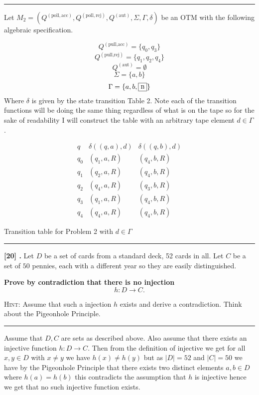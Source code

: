 \documentclass[11pt,twoside]{article}
\newcounter{problem}
\newcommand{\problem}[1]{%
\refstepcounter{problem}\noindent\textbf{[#1] \arabic{problem}.}}
\newcommand{\solution}{\bigskip\hrule\bigskip}
\newcommand{\problembreak}{\bigskip\hrule\bigskip}
\newcommand{\Qpollacc}{Q^{\left(\mathrm{poll,acc}\right)}}
\newcommand{\Qpollrej}{Q^{\left(\mathrm{poll,rej}\right)}}
\newcommand{\Qaut}{Q^{\left(\mathrm{aut}\right)}}
\newcommand{\blank}{\ensuremath\fbox{\sc b}}
\begin{document}
\solution

Let $M_2=(\Qpollacc,\Qpollrej,\Qaut,\Sigma,\Gamma,\delta)$ be an OTM with the following algebraic specification. 

\[
    Q^{(\text{pull,acc})}=\{q_0,q_3\}
\]
\[
    Q^{(\text{pull,rej})}=\{q_1,q_2,q_4\}    
\]
\[
\Qaut=\emptyset    
\]
\[
    \Sigma=\{a,b\}
\]
\[
    \Gamma=\{a,b,\blank\}
\]
Where $\delta$ is given by the state transition Table 2. Note each of the transition functions will be doing the same thing regardless of what is on the tape so for the sake of readability I will construct the table with an arbitrary tape element $d\in \Gamma$.

\begin{table}[bp]
    \begin{displaymath}
    \begin{array}{c|cccccc}
    q
    & \delta((q,a),d) & \delta((q,b),d)
    
    \\[2pt]\hline\hline
    q_0
    & (q_1,a,R) & (q_4,b,R)
    \\\hline
    q_1
    & (q_2,a,R) & (q_4,b,R)
    \\\hline
    q_2 & (q_4,a,R) & (q_3,b,R)
    \\\hline
    q_3 &
    (q_1,a,R) & (q_4,b,R)\\\hline
    q_4 & 
    (q_4,a,R) & (q_4,b,R)
    \end{array}
    \end{displaymath}
    \caption{Transition table for Problem 2 with  $d\in \Gamma$}
    \label{table:transition1}
    \end{table}
    

\problembreak

\newpage

\problem{20}
Let $D$ be a set of cards from a standard deck,
52 cards in all.
Let $C$ be a set of $50$ pennies,
each with a different year so they are easily distinguished.

{\bfseries
Prove by contradiction
that there is no injection
\begin{displaymath}
h:D\to C.
\end{displaymath}

{\normalfont\textsc{Hint:}}
Assume that such a injection $h$ exists
and derive a contradiction.
Think about the Pigeonhole Principle.
}

\solution

    Assume that $D,C$ are sets as described above. Also assume that there exists an injective function $h:D\to C$. Then from the definition of injective we get for all $x,y\in D$  with $x\not = y$ we have $h(x)\not = h(y)$ but as $|D|=52$ and $|C|=50$ we have by the Pigeonhole Principle that there exists two distinct elements $a,b\in D$ where $h(a)=h(b)$ this contradicts the assumption that $h$ is injective hence we get that no such injective function exists. 
\end{document}
